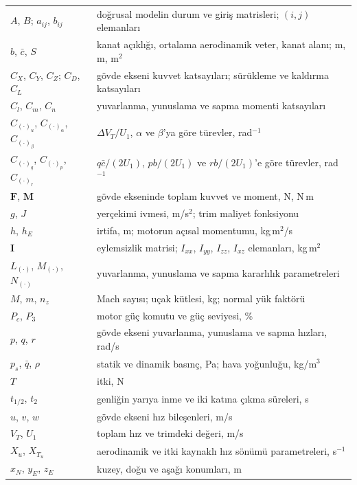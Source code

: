 \documentclass[conf]{new-aiaa}
\begin{document}
{\renewcommand\arraystretch{1.0}
\noindent\begin{longtable*}{@{}l @{\quad=\quad} l@{}}
$A$, $B$; $a_{ij}$, $b_{ij}$ & doğrusal modelin durum ve giriş matrisleri; $(i,j)$ elemanları \\
$b$, $\bar c$, $S$ & kanat açıklığı, ortalama aerodinamik veter, kanat alanı; m, m, m$^2$ \\
$C_X$, $C_Y$, $C_Z$; $C_D$, $C_L$ & gövde ekseni kuvvet katsayıları; sürükleme ve kaldırma katsayıları \\
$C_l$, $C_m$, $C_n$ & yuvarlanma, yunuslama ve sapma momenti katsayıları \\
$C_{(\cdot)_u}$, $C_{(\cdot)_\alpha}$, $C_{(\cdot)_\beta}$ & $\Delta V_T/U_1$, $\alpha$ ve $\beta$'ya göre türevler, rad$^{-1}$ \\
$C_{(\cdot)_q}$, $C_{(\cdot)_p}$, $C_{(\cdot)_r}$ & $q\bar c/(2U_1)$, $pb/(2U_1)$ ve $rb/(2U_1)$'e göre türevler, rad$^{-1}$ \\
$\mathbf F$, $\mathbf M$ & gövde ekseninde toplam kuvvet ve moment, N, N\,m \\
$g$, $J$ & yerçekimi ivmesi, m/s$^2$; trim maliyet fonksiyonu \\
$h$, $h_E$ & irtifa, m; motorun açısal momentumu, kg\,m$^2$/s \\
$\mathbf I$ & eylemsizlik matrisi; $I_{xx}$, $I_{yy}$, $I_{zz}$, $I_{xz}$ elemanları, kg\,m$^2$ \\
$L_{(\cdot)}$, $M_{(\cdot)}$, $N_{(\cdot)}$ & yuvarlanma, yunuslama ve sapma kararlılık parametreleri \\
$M$, $m$, $n_z$ & Mach sayısı; uçak kütlesi, kg; normal yük faktörü \\
$P_c$, $P_3$ & motor güç komutu ve güç seviyesi, \% \\
$p$, $q$, $r$ & gövde ekseni yuvarlanma, yunuslama ve sapma hızları, rad/s \\
$p_s$, $\bar q$, $\rho$ & statik ve dinamik basınç, Pa; hava yoğunluğu, kg/m$^3$ \\
$T$ & itki, N \\
$t_{1/2}$, $t_2$ & genliğin yarıya inme ve iki katına çıkma süreleri, s \\
$u$, $v$, $w$ & gövde ekseni hız bileşenleri, m/s \\
$V_T$, $U_1$ & toplam hız ve trimdeki değeri, m/s \\
$X_u$, $X_{T_u}$ & aerodinamik ve itki kaynaklı hız sönümü parametreleri, s$^{-1}$ \\
$x_N$, $y_E$, $z_E$ & kuzey, doğu ve aşağı konumları, m \\

\end{longtable*}}
\end{document}
